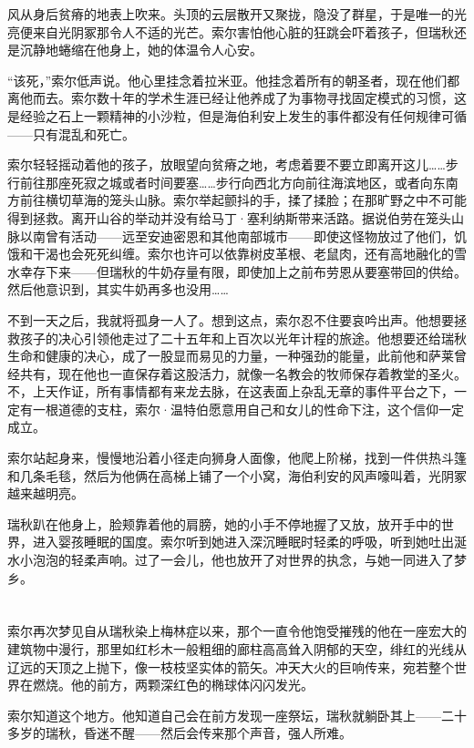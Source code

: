 \documentclass[AutoFakeBold=true]{book}
\begin{document}
风从身后贫瘠的地表上吹来。头顶的云层散开又聚拢，隐没了群星，于是唯一的光亮便来自光阴冢那令人不适的光芒。索尔害怕他心脏的狂跳会吓着孩子，但瑞秋还是沉静地蜷缩在他身上，她的体温令人心安。

``该死，''索尔低声说。他心里挂念着拉米亚。他挂念着所有的朝圣者，现在他们都离他而去。索尔数十年的学术生涯已经让他养成了为事物寻找固定模式的习惯，这是经验之石上一颗精神的小沙粒，但是海伯利安上发生的事件都没有任何规律可循——只有混乱和死亡。

索尔轻轻摇动着他的孩子，放眼望向贫瘠之地，考虑着要不要立即离开这儿……步行前往那座死寂之城或者时间要塞……步行向西北方向前往海滨地区，或者向东南方前往横切草海的笼头山脉。索尔举起颤抖的手，揉了揉脸；在那旷野之中不可能得到拯救。离开山谷的举动并没有给马丁·塞利纳斯带来活路。据说伯劳在笼头山脉以南曾有活动——远至安迪密恩和其他南部城市——即使这怪物放过了他们，饥饿和干渴也会死死纠缠。索尔也许可以依靠树皮革根、老鼠肉，还有高地融化的雪水幸存下来——但瑞秋的牛奶存量有限，即使加上之前布劳恩从要塞带回的供给。然后他意识到，其实牛奶再多也没用……

{\kaishu 不到一天之后，我就将孤身一人了。}想到这点，索尔忍不住要哀吟出声。他想要拯救孩子的决心引领他走过了二十五年和上百次以光年计程的旅途。他想要还给瑞秋生命和健康的决心，成了一股显而易见的力量，一种强劲的能量，此前他和萨莱曾经共有，现在他也一直保存着这股活力，就像一名教会的牧师保存着教堂的圣火。不，上天作证，所有事情都有来龙去脉，在这表面上杂乱无章的事件平台之下，一定有一根道德的支柱，索尔·温特伯愿意用自己和女儿的性命下注，这个信仰一定成立。

索尔站起身来，慢慢地沿着小径走向狮身人面像，他爬上阶梯，找到一件供热斗篷和几条毛毯，然后为他俩在高梯上铺了一个小窝，海伯利安的风声嚎叫着，光阴冢越来越明亮。

瑞秋趴在他身上，脸颊靠着他的肩膀，她的小手不停地握了又放，放开手中的世界，进入婴孩睡眠的国度。索尔听到她进入深沉睡眠时轻柔的呼吸，听到她吐出涎水小泡泡的轻柔声响。过了一会儿，他也放开了对世界的执念，与她一同进入了梦乡。

\chapter{}

索尔再次梦见自从瑞秋染上梅林症以来，那个一直令他饱受摧残的他在一座宏大的建筑物中漫行，那里如红杉木一般粗细的廊柱高高耸入阴郁的天空，绯红的光线从辽远的天顶之上抛下，像一枝枝坚实体的箭矢。冲天大火的巨响传来，宛若整个世界在燃烧。他的前方，两颗深红色的椭球体闪闪发光。

索尔知道这个地方。他知道自己会在前方发现一座祭坛，瑞秋就躺卧其上——二十多岁的瑞秋，昏迷不醒——然后会传来那个声音，强人所难。
\end{document}
